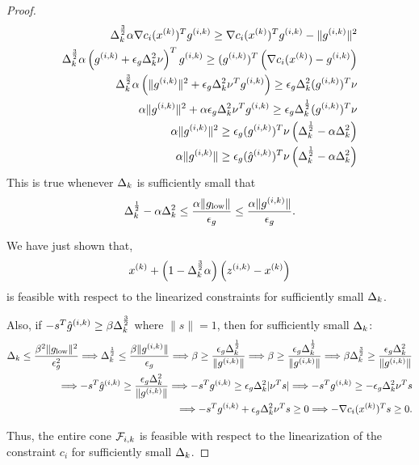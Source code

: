 \begin{proof}
\begin{align*}
\Delta_k^{\frac 3 2 }\alpha \nabla c_i({x^{(k)}}) ^T {g^{(i, k)}} \ge \nabla c_i({x^{(k)}}) ^T {g^{(i, k)}} - \|{g^{(i, k)}}\|^2 \\
\Delta_k^{\frac 3 2 }\alpha \left({g^{(i, k)}} + \epsilon_{g}\Delta_k^2\nu\right) ^T {g^{(i, k)}} \ge ({g^{(i, k)}})^T\left(\nabla c_i({x^{(k)}}) -{g^{(i, k)}}\right) \\
\Delta_k^{\frac 3 2 }\alpha \left(\|{g^{(i, k)}}\|^2 + \epsilon_{g}\Delta_k^2\nu^T{g^{(i, k)}}\right)  \ge \epsilon_{g}\Delta_k^2({g^{(i, k)}})^T\nu \\
\alpha\|{g^{(i, k)}}\|^2 + \alpha\epsilon_{g}\Delta_k^2\nu^T{g^{(i, k)}}  \ge \epsilon_{g}\Delta_k^{\frac 1 2}({g^{(i, k)}})^T\nu \\
\alpha\|{g^{(i, k)}}\|^2 \ge \epsilon_{g}({g^{(i, k)}})^T\nu\left(\Delta_k^{\frac 1 2} - \alpha\Delta_k^2\right)  \\
\alpha\|{g^{(i, k)}}\| \ge \epsilon_{g}({{\hat g}^{(i, k)}})^T\nu\left(\Delta_k^{\frac 1 2} - \alpha\Delta_k^2\right)  \\
\end{align*}
This is true whenever $\Delta_k$ is sufficiently small that
\begin{align*}
\Delta_k^{\frac 1 2} - \alpha\Delta_k^2 \le \frac{\alpha\|g_{\text{low}} \|}{\epsilon_{g}} \le \frac{\alpha\|{g^{(i, k)}}\|}{\epsilon_{g}}. \\
\end{align*}


We have just shown that, 
\begin{align*}
{x^{(k)}} + \left(1 - \Delta_k^{\frac 3 2 }\alpha\right)\left({z^{(i, k)}} - {x^{(k)}}\right)
\end{align*}
is feasible with respect to the linearized constraints for sufficiently small $\Delta_k$.

Also, if $-s^T {{\hat g}^{(i, k)}} \ge \beta \Delta_k^{\frac 3 2}$ where $\|s\| = 1$, then for sufficiently small $\Delta_k$:
\begin{align*}
\Delta_k \le \frac{\beta^2\|g_{\text{low}}\|^2}{\epsilon_g^2} 
\Longrightarrow \Delta_k^{\frac 1 2 } \le \frac{\beta\|{g^{(i, k)}}\|}{\epsilon_g}
\Longrightarrow \beta \ge \frac{\epsilon_{g}\Delta_k^{\frac 1 2}}{\|{g^{(i, k)}}\|}
\Longrightarrow \beta \ge \frac{\epsilon_{g}\Delta_k^{\frac 1 2}}{\|{g^{(i, k)}}\|}
\Longrightarrow \beta\Delta_k^{\frac 3 2} \ge \frac{\epsilon_{g}\Delta_k^2}{\|{g^{(i, k)}}\|} \\
\Longrightarrow -s^T{{\hat g}^{(i, k)}} \ge \frac{\epsilon_{g}\Delta_k^2}{\|{g^{(i, k)}}\|} 
\Longrightarrow -s^T{g^{(i, k)}} \ge \epsilon_{g}\Delta_k^2|\nu^T s|
\Longrightarrow -s^T{g^{(i, k)}} \ge -\epsilon_{g}\Delta_k^2\nu^T s \\
\Longrightarrow -s^T{g^{(i, k)}} + \epsilon_{g}\Delta_k^2\nu^T s \ge 0
\Longrightarrow -\nabla c_i({x^{(k)}})^T s \ge 0.
\end{align*}

Thus, the entire cone ${\mathcal F_{i, k}}$ is feasible with respect to the linearization of the constraint $c_i$ for sufficiently small $\Delta_k$.





\end{proof}
